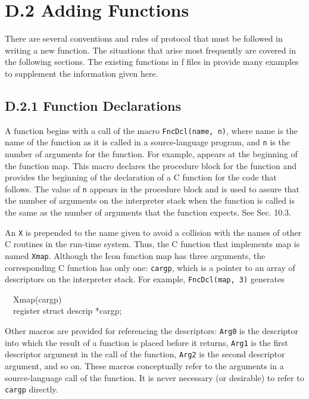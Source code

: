 \section[D.2 Adding Functions]{D.2 Adding Functions}

There are several conventions and rules of protocol that must be followed
in writing a new function. The situations that arise most frequently are
covered in the following sections. The existing functions in f files in
 provide many examples to supplement the information given
here.

\subsection[D.2.1 Function Declarations]{D.2.1 Function Declarations}

A function begins with a call of the macro \texttt{\color{red}FncDcl(name, n)}, where
name is the name of the function as it is called in a source-language
program, and \texttt{n} is the number of arguments for the function. For
example,
\noindent
appears at the beginning of the function map. This macro declares the
procedure block for the function and provides the beginning of the
declaration of a C function for the code that follows. The value of
\texttt{n} appears in the procedure block and is used to assure that the
number of arguments on the interpreter stack when the function is called is
the same as the number of arguments that the function expects. See
Sec. 10.3.

An \texttt{X} is prepended to the name given to avoid a collision with the
names of other C routines in the run-time system.  Thus, the C function
that implements map is named \texttt{Xmap}. Although the Icon function map
has three arguments, the corresponding C function has only one:
\texttt{cargp}, which is a pointer to an array of descriptors on the
interpreter stack.  For example, \texttt{\color{red}FncDcl(map, 3)} generates
\goodbreak
\begin{iconcode}
\ \ Xmap(cargp)\\
\ \ register struct descrip *cargp;
\end{iconcode}
\noindent
Other macros are provided for referencing the descriptors: \texttt{Arg0} is
the descriptor into which the result of a function is placed before it
returns, \texttt{Arg1} is the first descriptor argument in the call of the
function, \texttt{Arg2} is the second descriptor argument, and so on. These
macros conceptually refer to the arguments in a source-language call of the
function. It is never necessary (or desirable) to refer to \texttt{cargp}
directly.

